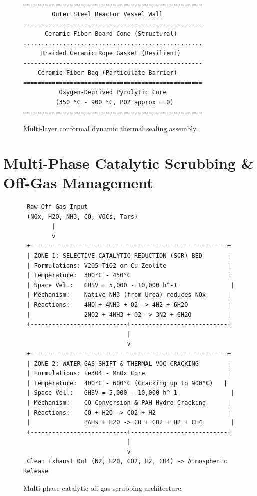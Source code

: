 \documentclass[10pt,twocolumn,a4paper]{article}
\begin{document}
\begin{figure}[H]
\centering
\small
\begin{verbatim}
==================================================
        Outer Steel Reactor Vessel Wall
--------------------------------------------------
      Ceramic Fiber Board Cone (Structural)
..................................................
     Braided Ceramic Rope Gasket (Resilient)
--------------------------------------------------
    Ceramic Fiber Bag (Particulate Barrier)
==================================================
          Oxygen-Deprived Pyrolytic Core
         (350 °C - 900 °C, PO2 approx = 0)
==================================================
\end{verbatim}
\caption{Multi-layer conformal dynamic thermal sealing assembly.}
\label{fig:sealing_assembly}
\end{figure}

\section{Multi-Phase Catalytic Scrubbing \& Off-Gas Management}

\begin{figure}[H]
\centering
\small
\begin{verbatim}
 Raw Off-Gas Input
 (NOx, H2O, NH3, CO, VOCs, Tars)
        |
        v
 +-------------------------------------------------------+
 | ZONE 1: SELECTIVE CATALYTIC REDUCTION (SCR) BED       |
 | Formulations: V2O5-TiO2 or Cu-Zeolite                 |
 | Temperature:  300°C - 450°C                           |
 | Space Vel.:   GHSV = 5,000 - 10,000 h^-1               |
 | Mechanism:    Native NH3 (from Urea) reduces NOx      |
 | Reactions:    4NO + 4NH3 + O2 -> 4N2 + 6H2O           |
 |               2NO2 + 4NH3 + O2 -> 3N2 + 6H2O          |
 +---------------------------+---------------------------+
                             |
                             v
 +-------------------------------------------------------+
 | ZONE 2: WATER-GAS SHIFT & THERMAL VOC CRACKING        |
 | Formulations: Fe3O4 - MnOx Core                       |
 | Temperature:  400°C - 600°C (Cracking up to 900°C)   |
 | Space Vel.:   GHSV = 5,000 - 10,000 h^-1               |
 | Mechanism:    CO Conversion & PAH Hydro-Cracking      |
 | Reactions:    CO + H2O -> CO2 + H2                    |
 |               PAHs + H2O -> CO + CO2 + H2 + CH4        |
 +---------------------------+---------------------------+
                             |
                             v
 Clean Exhaust Out (N2, H2O, CO2, H2, CH4) -> Atmospheric Release
\end{verbatim}
\caption{Multi-phase catalytic off-gas scrubbing architecture.}
\label{fig:catalytic_scrubbing}
\end{figure}
\end{document}
